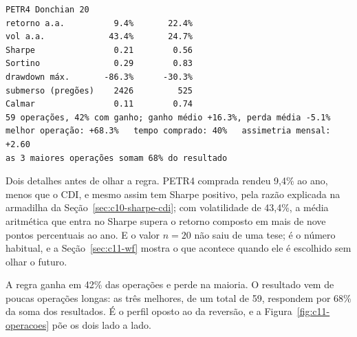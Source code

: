\begin{lstlisting}[style=saida]
                     PETR4 Donchian 20
retorno a.a.          9.4%       22.4%
vol a.a.             43.4%       24.7%
Sharpe                0.21        0.56
Sortino               0.29        0.83
drawdown máx.       -86.3%      -30.3%
submerso (pregões)    2426         525
Calmar                0.11        0.74
59 operações, 42% com ganho; ganho médio +16.3%, perda média -5.1%
melhor operação: +68.3%   tempo comprado: 40%   assimetria mensal: +2.60
as 3 maiores operações somam 68% do resultado
\end{lstlisting}


Dois detalhes antes de olhar a regra. PETR4 comprada rendeu 9,4\% ao ano, menos que o CDI, e mesmo assim tem Sharpe positivo, pela razão explicada na armadilha da Seção~\ref{sec:c10-sharpe-cdi}; com volatilidade de 43,4\%, a média aritmética que entra no Sharpe supera o retorno composto em mais de nove pontos percentuais ao ano. E o valor $n = 20$ não saiu de uma tese; é o número habitual, e a Seção~\ref{sec:c11-wf} mostra o que acontece quando ele é escolhido sem olhar o futuro.

A regra ganha em 42\% das operações e perde na maioria. O resultado vem de poucas operações longas: as três melhores, de um total de 59, respondem por 68\% da soma dos resultados. É o perfil oposto ao da reversão, e a Figura~\ref{fig:c11-operacoes} põe os dois lado a lado.


